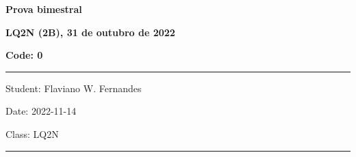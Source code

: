 \documentclass[12pt, addpoints]{exam}
\begin{document}
    \begin{minipage}[b]{0.75\linewidth}
        \begin{flushleft}
            {\bf \large Prova bimestral}
        \end{flushleft}
        \begin{flushleft}
            {\bf \large LQ2N (2B), 31 de outubro de 2022}
        \end{flushleft}
    \end{minipage}
    \begin{minipage}[b]{0.20\linewidth}
        \begin{flushright}
            {\bf \large Code: 0}
        \end{flushright}
    \end{minipage}
    \vspace{0.5cm} \hrule \vspace{0.5cm}
    \begin{minipage}{0.50\linewidth}
        \begin{flushleft}
            Student: Flaviano W. Fernandes
        \end{flushleft}
    \end{minipage}
    \begin{minipage}{0.20\linewidth}
        \begin{center}
            Date: 2022-11-14
        \end{center}
    \end{minipage}
    \begin{minipage}{0.20\linewidth}
        \begin{flushright}
            Class: LQ2N
        \end{flushright}
    \end{minipage}
    \vspace{0.5cm} \hrule \vspace{0.5cm}
\end{document}
